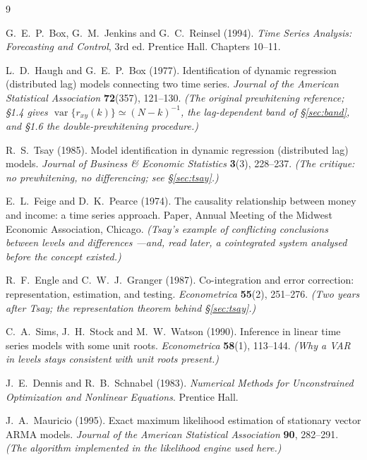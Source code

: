 \documentclass[11pt,a4paper]{article}
\theoremstyle{plain}
\theoremstyle{remark}
\begin{document}
\begin{thebibliography}{9}

G.~E.~P.~Box, G.~M.~Jenkins and G.~C.~Reinsel (1994).
\emph{Time Series Analysis: Forecasting and Control}, 3rd ed. Prentice Hall.
Chapters 10--11.

L.~D.~Haugh and G.~E.~P.~Box (1977).
Identification of dynamic regression (distributed lag) models connecting two
time series.
\emph{Journal of the American Statistical Association} \textbf{72}(357),
121--130.
\emph{(The original prewhitening reference; \S1.4 gives
$\operatorname{var}\{r_{xy}(k)\}\simeq(N-k)^{-1}$, the lag-dependent band of
\S\ref{sec:band}, and \S1.6 the double-prewhitening procedure.)}

R.~S.~Tsay (1985).
Model identification in dynamic regression (distributed lag) models.
\emph{Journal of Business \& Economic Statistics} \textbf{3}(3), 228--237.
\emph{(The critique: no prewhitening, no differencing; see \S\ref{sec:tsay}.)}

E.~L.~Feige and D.~K.~Pearce (1974).
The causality relationship between money and income: a time series approach.
Paper, Annual Meeting of the Midwest Economic Association, Chicago.
\emph{(Tsay's example of conflicting conclusions between levels and differences
---and, read later, a cointegrated system analysed before the concept existed.)}

R.~F.~Engle and C.~W.~J.~Granger (1987).
Co-integration and error correction: representation, estimation, and testing.
\emph{Econometrica} \textbf{55}(2), 251--276.
\emph{(Two years after Tsay; the representation theorem behind
\S\ref{sec:tsay}.)}

C.~A.~Sims, J.~H.~Stock and M.~W.~Watson (1990).
Inference in linear time series models with some unit roots.
\emph{Econometrica} \textbf{58}(1), 113--144.
\emph{(Why a VAR in levels stays consistent with unit roots present.)}

J.~E.~Dennis and R.~B.~Schnabel (1983).
\emph{Numerical Methods for Unconstrained Optimization and Nonlinear Equations}.
Prentice Hall.

J.~A.~Mauricio (1995).
Exact maximum likelihood estimation of stationary vector ARMA models.
\emph{Journal of the American Statistical Association} \textbf{90}, 282--291.
\emph{(The algorithm implemented in the likelihood engine used here.)}


\end{thebibliography}
\end{document}
